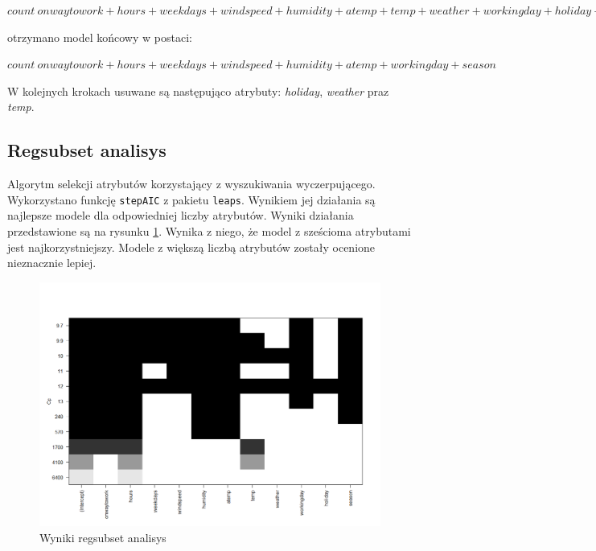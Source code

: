 \documentclass[a4paper,12pt]{article}
\begin{document}
        $count ~ onwaytowork + hours + weekdays + windspeed + humidity + atemp + temp + weather + workingday + holiday + season$
        
        otrzymano model końcowy w postaci:
        
        $count ~ onwaytowork + hours + weekdays + windspeed + humidity + atemp + workingday + season$
        
        W kolejnych krokach usuwane są następująco atrybuty: \textit{holiday}, \textit{weather} praz \textit{temp}.
       
    \subsection{Regsubset analisys}
        Algorytm selekcji atrybutów korzystający z wyszukiwania wyczerpującego. Wykorzystano funkcję \texttt{stepAIC} z pakietu \texttt{leaps}. Wynikiem jej działania są najlepsze modele dla odpowiedniej liczby atrybutów. Wyniki działania przedstawione są na rysunku \ref{fig:regsubset}. Wynika z niego, że model z sześcioma atrybutami jest najkorzystniejszy. Modele z większą liczbą atrybutów zostały ocenione nieznacznie lepiej.
        \begin{figure}[h]
            \centering
            \includegraphics[width=\linewidth]{regsubsetanalysis}
            \caption{Wyniki regsubset analisys}
            \label{fig:regsubset}
        \end{figure}
        
\end{document}
